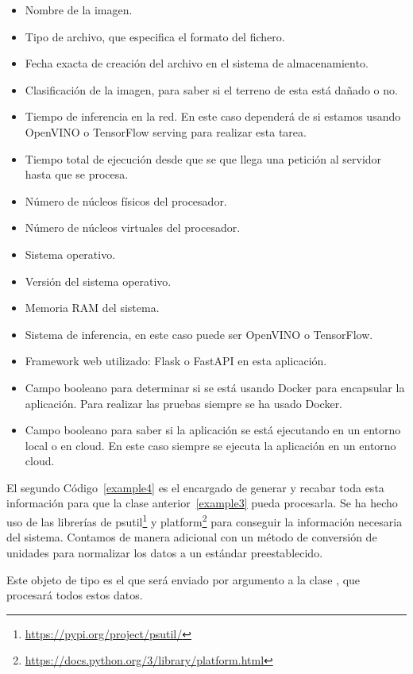 \begin{itemize}
    \item Nombre de la imagen.
    \item Tipo de archivo, que especifica el formato del fichero.
    \item Fecha exacta de creación del archivo en el sistema de almacenamiento.
    \item Clasificación de la imagen, para saber si el terreno de esta está dañado o no.
    \item Tiempo de inferencia en la red.
    En este caso dependerá de si estamos usando OpenVINO o TensorFlow serving para realizar esta tarea.
    \item Tiempo total de ejecución desde que se que llega una petición al servidor hasta que se procesa.
    \item Número de núcleos físicos del procesador.
    \item Número de núcleos virtuales del procesador.
    \item Sistema operativo.
    \item Versión del sistema operativo.
    \item Memoria RAM del sistema.
    \item Sistema de inferencia, en este caso puede ser OpenVINO o TensorFlow.
    \item Framework web utilizado: Flask o FastAPI en esta aplicación.
    \item Campo booleano para determinar si se está usando Docker para encapsular la aplicación.
    Para realizar las pruebas siempre se ha usado Docker.
    \item Campo booleano para saber si la aplicación se está ejecutando en un entorno local o en cloud.
    En este caso siempre se ejecuta la aplicación en un entorno cloud.
\end{itemize}



El segundo Código~\ref{example4} es el encargado de generar y recabar toda esta información para que la clase anterior~\ref{example3} pueda procesarla.
Se ha hecho uso de las librerías de psutil\footnote{\url{https://pypi.org/project/psutil/}} y platform\footnote{\url{https://docs.python.org/3/library/platform.html}} para conseguir la información necesaria del sistema.
Contamos de manera adicional con un método de conversión de unidades para normalizar los datos a un estándar preestablecido.

Este objeto de tipo  es el que será enviado por argumento a la clase , que procesará todos estos datos.


